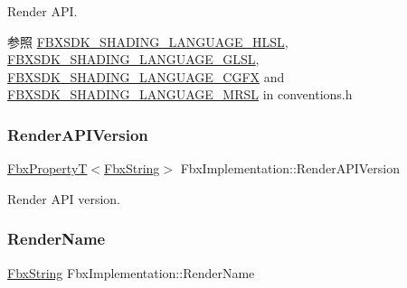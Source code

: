 Render A\+PI. \begin{DoxySeeAlso}{参照}
\hyperlink{fbxshadingconventions_8h_ac10b54a713e5562fe6572d1a2594288f}{F\+B\+X\+S\+D\+K\+\_\+\+S\+H\+A\+D\+I\+N\+G\+\_\+\+L\+A\+N\+G\+U\+A\+G\+E\+\_\+\+H\+L\+SL}, \hyperlink{fbxshadingconventions_8h_a52222f21db3187bf9ed4986f053aa44f}{F\+B\+X\+S\+D\+K\+\_\+\+S\+H\+A\+D\+I\+N\+G\+\_\+\+L\+A\+N\+G\+U\+A\+G\+E\+\_\+\+G\+L\+SL}, \hyperlink{fbxshadingconventions_8h_a0551f4268e3fc2e0fcd9464297b31b6f}{F\+B\+X\+S\+D\+K\+\_\+\+S\+H\+A\+D\+I\+N\+G\+\_\+\+L\+A\+N\+G\+U\+A\+G\+E\+\_\+\+C\+G\+FX} and \hyperlink{fbxshadingconventions_8h_a7941affa96f6fc8d3345dac506c71ea2}{F\+B\+X\+S\+D\+K\+\_\+\+S\+H\+A\+D\+I\+N\+G\+\_\+\+L\+A\+N\+G\+U\+A\+G\+E\+\_\+\+M\+R\+SL} in conventions.\+h 
\end{DoxySeeAlso}
\mbox{\label{class_fbx_implementation_a66ac67e482f39a4e71389f33f1c69648}} 
\subsubsection{\texorpdfstring{Render\+A\+P\+I\+Version}{RenderAPIVersion}}
{\footnotesize\ttfamily \hyperlink{class_fbx_property_t}{Fbx\+PropertyT}$<$\hyperlink{class_fbx_string}{Fbx\+String}$>$ Fbx\+Implementation\+::\+Render\+A\+P\+I\+Version}



Render A\+PI version. 

\mbox{\label{class_fbx_implementation_a1c5e1e5480c227977a92668d77c13ce8}} 
\subsubsection{\texorpdfstring{Render\+Name}{RenderName}}
{\footnotesize\ttfamily \hyperlink{class_fbx_string}{Fbx\+String} Fbx\+Implementation\+::\+Render\+Name}

\mbox{\label{class_fbx_implementation_a80df4effca2446b00f8925634c3d26aa}} 

